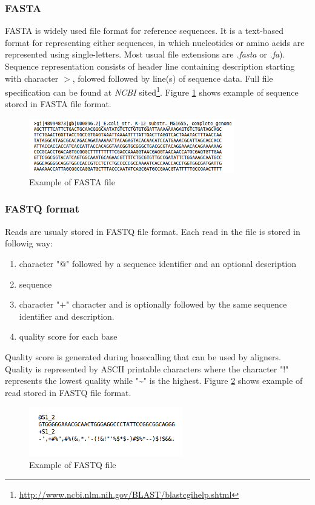 \documentclass[times, utf8, diplomski, numeric, english]{fer}
\begin{document}
\subsubsection{FASTA}


FASTA is widely used file format for reference sequences. It is a text-based format for representing either sequences, in which nucleotides or amino acids are represented using single-letters. Most usual file extensions are \textit{.fasta} or \textit{.fa}).
Sequence representation consists of header line containing description starting with character $ > $, folowed followed by line(s) of sequence data. Full file specification can be found at \textit{NCBI} sited\footnote{\url{http://www.ncbi.nlm.nih.gov/BLAST/blastcgihelp.shtml}}.
 Figure \ref{fg:fsta} shows example of sequence stored in FASTA file format.
\begin{figure}[!ht]
	\begin{center}
		\includegraphics[width=0.8\textwidth]{./imgs/fasta.png}
		\caption{Example of FASTA file}
		\label{fg:fsta}
	\end{center}
\end{figure} 

\subsubsection{FASTQ format}
Reads are usualy stored in FASTQ file format. Each read in the file is stored in followig way:
\begin{enumerate}
	\item character "$@$" followed  by a sequence identifier and an optional description 
	\item sequence
	\item character "$+$" character and is optionally followed by the same sequence identifier and description.
	\item quality score for each base
\end{enumerate}
Quality score is generated during basecalling that can be used by aligners. Quality is represented by ASCII printable characters where
the character "$!$" represents the lowest quality while "\textasciitilde" is the highest. Figure \ref{fg:fq} shows example of read stored in FASTQ file format.
\begin{figure}[!ht]
	\begin{center}
		\includegraphics[width=0.6\textwidth]{./imgs/fq.png}
		\caption{Example of FASTQ file}
		\label{fg:fq}
	\end{center}
\end{figure} 
\end{document}
